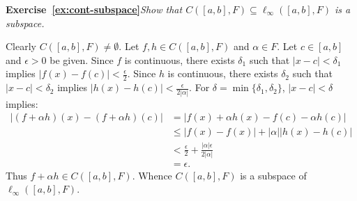    \textbf{Exercise~\ref{ex:cont-subspace}}\hspace{6pt}\textit{Show that $C([a,b], F) \subseteq \ell_\infty([a,b],F)$ is a subspace.}
        \begin{solution}
            Clearly $C([a,b],F) \neq \emptyset$. Let $f,h \in C([a,b],F)$ and $\alpha \in F$. Let $c \in [a,b]$ and $\epsilon >0$ be given. Since $f$ is continuous, there exists $\delta_1$ such that $|x-c| < \delta_1$ implies $|f(x) - f(c)| < \frac{\epsilon}{2}$. Since $h$ is continuous, there exists $\delta_2$ such that $|x-c| < \delta_2$ implies $|h(x) - h(c)| < \frac{\epsilon}{2|\alpha|}$. For $\delta = \min\{\delta_1,\delta_2\}$, $|x-c| < \delta$ implies:
                \begin{equation*}
                \begin{split}
                    |(f+\alpha h)(x) - (f + \alpha h)(c)|
                    & = |f(x) + \alpha h(x) - f(c) - \alpha h(c)| \\
                    & \leq |f(x) - f(x)| + |\alpha||h(x) - h(c)| \\
                    & < \frac{\epsilon}{2} + \frac{|\alpha|\epsilon}{2|\alpha|} \\
                    & = \epsilon.
                \end{split}
                \end{equation*}
            Thus $f+\alpha h \in C([a,b],F)$. Whence $C([a,b],F)$ is a subspace of $\ell_\infty([a,b],F)$.
        \end{solution}
        \vspace{8pt}

